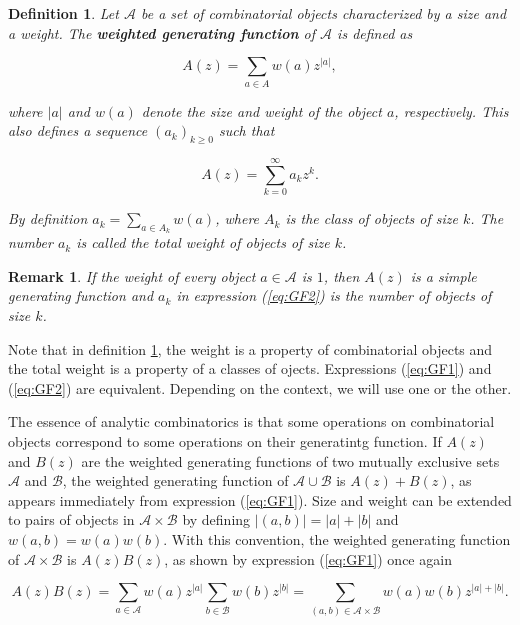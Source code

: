 \documentclass{article}
\newtheorem{definition}{Definition}
\newtheorem{remark}{Remark}
\begin{document}
\begin{definition}
\label{def:GF}
Let $\mathcal{A}$ be a set of combinatorial objects characterized by a
size and a weight. The \textbf{weighted generating function} of
$\mathcal{A}$ is defined as

\begin{equation}
\label{eq:GF1}
A(z) = \sum_{a \in A} w(a) z^{|a|},
\end{equation}

\noindent
where $|a|$ and $w(a)$ denote the size and weight of the object $a$,
respectively. This also defines a sequence $(a_k)_{k \geq 0}$ such that 

\begin{equation}
\label{eq:GF2}
A(z) = \sum_{k=0}^\infty a_k z^k.
\end{equation}

By definition $a_k = \sum_{a \in A_k}w(a)$, where $A_k$ is the class of
objects of size $k$. The number $a_k$ is called the total weight of
objects of size $k$.
\end{definition}

\begin{remark}
\label{rem:noweight}
If the weight of every object $a \in \mathcal{A}$ is $1$, then $A(z)$ is a
simple generating function and $a_k$ in expression (\ref{eq:GF2}) is
the number of objects of size $k$.
\end{remark}

Note that in definition \ref{def:GF}, the weight is a property of
combinatorial objects and the total weight is a property of a classes of
ojects. Expressions (\ref{eq:GF1}) and (\ref{eq:GF2}) are equivalent.
Depending on the context, we will use one or the other.

The essence of analytic combinatorics is that some operations on
combinatorial objects correspond to some operations on their generatintg
function. If $A(z)$ and $B(z)$ are the weighted generating functions of
two mutually exclusive sets $\mathcal{A}$ and $\mathcal{B}$, the weighted
generating function of $\mathcal{A} \cup \mathcal{B}$ is $A(z) + B(z)$, as
appears immediately from expression (\ref{eq:GF1}). Size and weight can be
extended to pairs of objects in $\mathcal{A} \times \mathcal{B}$ by
defining $|(a,b)| = |a| + |b|$ and $w(a,b) = w(a)w(b)$. With this
convention, the weighted generating function of $\mathcal{A} \times
\mathcal{B}$ is $A(z)B(z)$, as shown by expression (\ref{eq:GF1})
once again

\begin{equation*}
A(z)B(z) =
\sum_{a\in \mathcal{A}}w(a)z^{|a|} \sum_{b\in \mathcal{B}}w(b)z^{|b|}
= \sum_{(a,b) \in \mathcal{A} \times \mathcal{B}} w(a)w(b)z^{|a|+|b|}.
\end{equation*}
\end{document}
